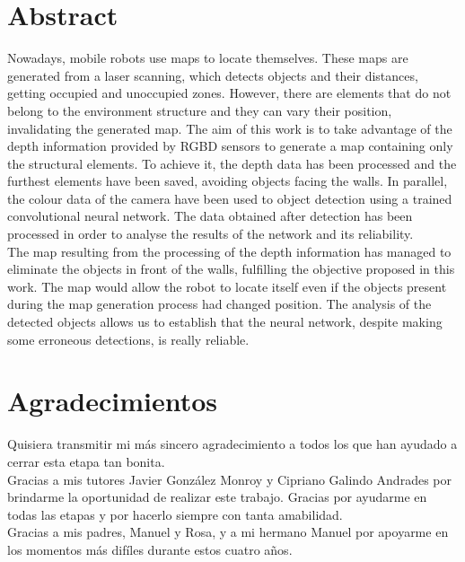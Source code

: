 \chapter*{Abstract}

Nowadays, mobile robots use maps to locate themselves. These maps are generated from a laser scanning, which detects objects and their distances, getting occupied and unoccupied zones. However, there are elements that do not belong to the environment structure and they can vary their position, invalidating the generated map. The aim of this work is to take advantage of the depth information provided by RGBD sensors to generate a map containing only the structural elements. To achieve it, the depth data has been processed and the furthest elements have been saved, avoiding objects facing the walls. In parallel, the colour data of the camera have been used to object detection using a trained convolutional neural network. The data obtained after detection has been processed in order to analyse the results of the network and its reliability.\\

The map resulting from the processing of the depth information has managed to eliminate the objects in front of the walls, fulfilling the objective proposed in this work. The map would allow the robot to locate itself even if the objects present during the map generation process had changed position. The analysis of the detected objects allows us to establish that the neural network, despite making some erroneous detections, is really reliable.



\chapter*{Agradecimientos}

Quisiera transmitir mi más sincero agradecimiento a todos los que han ayudado a cerrar esta etapa tan bonita.\\

Gracias a mis tutores Javier González Monroy y Cipriano Galindo Andrades por brindarme la oportunidad de realizar este trabajo. Gracias por ayudarme en todas las etapas y por hacerlo siempre con tanta amabilidad.\\

Gracias a mis padres, Manuel y Rosa, y a mi hermano Manuel por apoyarme en los momentos más difíles durante estos cuatro años.\\

